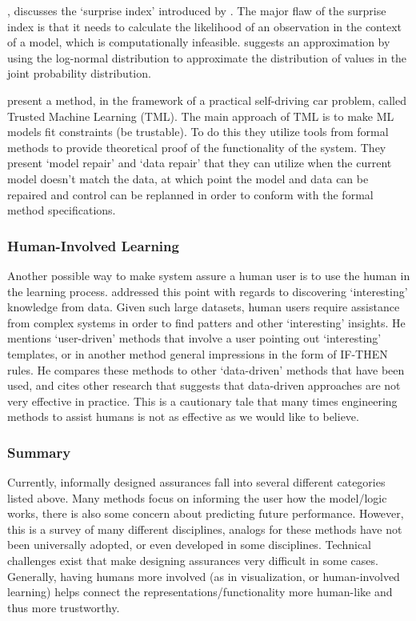     \citet{Zagorecki2015-qy}, discusses the `surprise index' introduced by \citet{Habbema1976-xd}. The major flaw of the surprise index is that it needs to calculate the likelihood of an observation in the context of a model, which is computationally infeasible. \citeauthor{Zagorecki2015-qy} suggests an approximation by using the log-normal distribution to approximate the distribution of values in the joint probability distribution.

    \citet{Ghosh2016-dl} present a method, in the framework of a practical self-driving car problem, called Trusted Machine Learning (TML). The main approach of TML is to make ML models fit constraints (be trustable). To do this they utilize tools from formal methods to provide theoretical proof of the functionality of the system. They present `model repair' and `data repair' that they can utilize when the current model doesn't match the data, at which point the model and data can be repaired and control can be replanned in order to conform with the formal method specifications. 

\subsubsection{Human-Involved Learning}
    Another possible way to make system assure a human user is to use the human in the learning process. \citet{Freitas2006-qo} addressed this point with regards to discovering `interesting' knowledge from data. Given such large datasets, human users require assistance from complex systems in order to find patters and other `interesting' insights. He mentions `user-driven' methods that involve a user pointing out `interesting' templates, or in another method general impressions in the form of IF-THEN rules. He compares these methods to other `data-driven' methods that have been used, and cites other research that suggests that data-driven approaches are not very effective in practice. This is a cautionary tale that many times engineering methods to assist humans is not as effective as we would like to believe.

\subsubsection{Summary}
Currently, informally designed assurances fall into several different categories listed above. Many methods focus on informing the user how the model/logic works, there is also some concern about predicting future performance. However, this is a survey of many different disciplines, analogs for these methods have not been universally adopted, or even developed in some disciplines. Technical challenges exist that make designing assurances very difficult in some cases. Generally, having humans more involved (as in visualization, or human-involved learning) helps connect the representations/functionality more human-like and thus more trustworthy.
